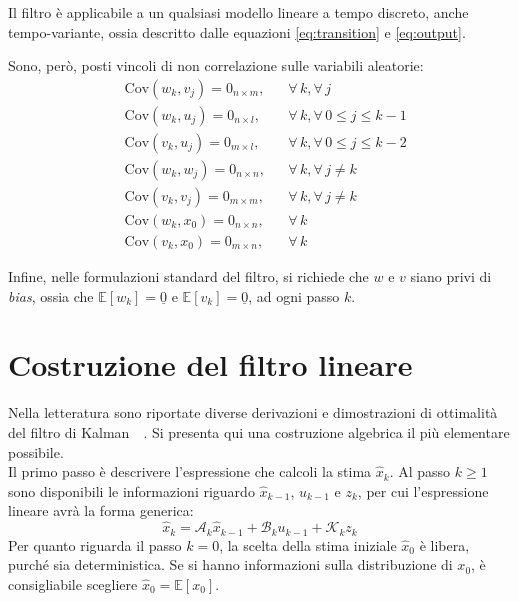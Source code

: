 \documentclass[12pt,a4paper,openright,twoside]{book}
\begin{document}
Il filtro è applicabile a un qualsiasi modello lineare a tempo discreto, anche tempo-variante, ossia descritto dalle equazioni \ref{eq:transition} e \ref{eq:output}.

Sono, però, posti vincoli di non correlazione sulle variabili aleatorie:
\begin{align*}
& \mathrm{Cov}(w_k,v_j)=0_{n\times m}, && \forall\,k,\forall\,j \\
& \mathrm{Cov}(w_k,u_j)=0_{n\times l}, && \forall\,k,\forall\,0\leq j\leq k-1 \\
& \mathrm{Cov}(v_k,u_j)=0_{m\times l}, && \forall\,k,\forall\,0\leq j\leq k-2 \\
& \mathrm{Cov}(w_k,w_j)=0_{n\times n}, && \forall\,k,\forall\,j\neq k \\
& \mathrm{Cov}(v_k,v_j)=0_{m\times m}, && \forall\,k,\forall\,j\neq k \\
& \mathrm{Cov}(w_k,x_0)=0_{n\times n}, && \forall\,k \\
& \mathrm{Cov}(v_k,x_0)=0_{m\times n}, && \forall\,k
\end{align*}

Infine, nelle formulazioni standard del filtro, si richiede che $w$ e $v$ siano privi di \textit{bias}, ossia che $\mathbb{E}[w_k]=\underline{0}$ e $\mathbb{E}[v_k]=\underline{0}$, ad ogni passo $k$.

\section{Costruzione del filtro lineare}

Nella letteratura sono riportate diverse derivazioni e dimostrazioni di ottimalità del filtro di Kalman~\cite[pp.~107-113]{10.5555/2823801}~\cite{10.48550/arXiv.1910.03558}. Si presenta qui una costruzione algebrica il più elementare possibile. \\

Il primo passo è descrivere l'espressione che calcoli la stima $\hat{x}_k$. Al passo $k\geq 1$ sono disponibili le informazioni riguardo $\hat{x}_{k-1}$, $u_{k-1}$ e $z_k$, per cui l'espressione lineare avrà la forma generica:
\begin{equation} \label{eq:generic-estimate}
\hat{x}_k=\mathcal{A}_k\hat{x}_{k-1}+\mathcal{B}_ku_{k-1}+\mathcal{K}_kz_k
\end{equation}
Per quanto riguarda il passo $k=0$, la scelta della stima iniziale $\hat{x}_0$ è libera, purché sia deterministica. Se si hanno informazioni sulla distribuzione di $x_0$, è consigliabile scegliere $\hat{x}_0=\mathbb{E}[x_0]$. \\
\end{document}
